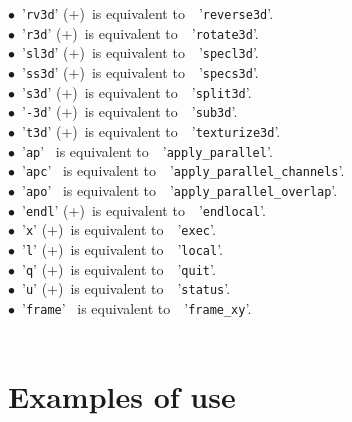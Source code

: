 \documentclass[a4paper,10.5pt,twoside]{book}
\newcommand{\Ca}[1]{\textcolor{ca}{#1}}
\begin{document}
$\bullet$~'\texttt{\Ca{rv3d}}' (+)~is equivalent to~~'\texttt{\Ca{reverse3d}}'.\\
$\bullet$~'\texttt{\Ca{r3d}}' (+)~is equivalent to~~'\texttt{\Ca{rotate3d}}'.\\
$\bullet$~'\texttt{\Ca{sl3d}}' (+)~is equivalent to~~'\texttt{\Ca{specl3d}}'.\\
$\bullet$~'\texttt{\Ca{ss3d}}' (+)~is equivalent to~~'\texttt{\Ca{specs3d}}'.\\
$\bullet$~'\texttt{\Ca{s3d}}' (+)~is equivalent to~~'\texttt{\Ca{split3d}}'.\\
$\bullet$~'\texttt{\Ca{-3d}}' (+)~is equivalent to~~'\texttt{\Ca{sub3d}}'.\\
$\bullet$~'\texttt{\Ca{t3d}}' (+)~is equivalent to~~'\texttt{\Ca{texturize3d}}'.\\
$\bullet$~'\texttt{\Ca{ap}}' ~is equivalent to~~'\texttt{\Ca{apply\_parallel}}'.\\
$\bullet$~'\texttt{\Ca{apc}}' ~is equivalent to~~'\texttt{\Ca{apply\_parallel\_channels}}'.\\
$\bullet$~'\texttt{\Ca{apo}}' ~is equivalent to~~'\texttt{\Ca{apply\_parallel\_overlap}}'.\\
$\bullet$~'\texttt{\Ca{endl}}' (+)~is equivalent to~~'\texttt{\Ca{endlocal}}'.\\
$\bullet$~'\texttt{\Ca{x}}' (+)~is equivalent to~~'\texttt{\Ca{exec}}'.\\
$\bullet$~'\texttt{\Ca{l}}' (+)~is equivalent to~~'\texttt{\Ca{local}}'.\\
$\bullet$~'\texttt{\Ca{q}}' (+)~is equivalent to~~'\texttt{\Ca{quit}}'.\\
$\bullet$~'\texttt{\Ca{u}}' (+)~is equivalent to~~'\texttt{\Ca{status}}'.\\
$\bullet$~'\texttt{\Ca{frame}}' ~is equivalent to~~'\texttt{\Ca{frame\_xy}}'.\\
~\\\section{Examples of use}
\small
\end{document}
